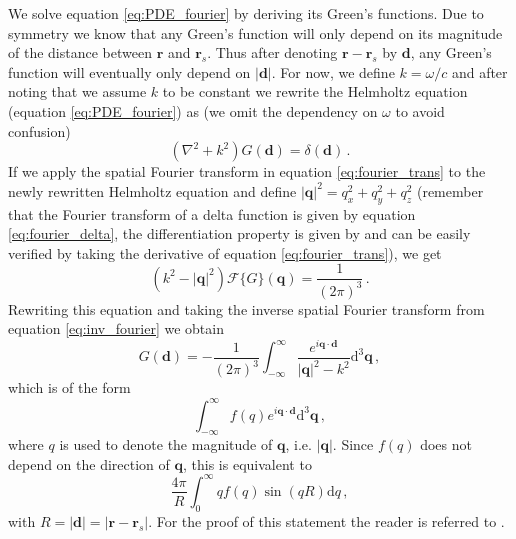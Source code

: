 We solve equation \ref{eq:PDE_fourier} by deriving its Green's functions.
Due to symmetry we know that any Green's function will only depend on its magnitude of the distance between $\mathbf r$ and $\mathbf r_s$.
Thus after denoting $\mathbf r - \mathbf r_s$ by $\mathbf d$, any Green's function will eventually only depend on $|\mathbf d|$.
For now, we define $k = \omega/c$ and after noting that we assume $k$ to be constant we rewrite the Helmholtz equation (equation \ref{eq:PDE_fourier}) as (we omit the dependency on $\omega$ to avoid confusion)
\begin{equation}
    (\nabla^2 + k^2) G(\mathbf d) = \delta(\mathbf d)\,.\nonumber
\end{equation}
If we apply the spatial Fourier transform in equation \ref{eq:fourier_trans} to the newly rewritten Helmholtz equation and define $|\mathbf q|^2 = q_x^2 + q_y^2 + q_z^2$ (remember that the Fourier transform of a delta function is given by equation \ref{eq:fourier_delta}, the differentiation property is given by \citeauthor{Fourier_transform} \cite[Section 3.4.3]{Fourier_transform} and can be easily verified by taking the derivative of equation \ref{eq:fourier_trans}), we get
\begin{equation}
    (k^2 - |\mathbf q|^2) \mathcal F\{ G\} (\mathbf q) = \frac{1}{(2\pi)^3} \,. \nonumber
\end{equation}
Rewriting this equation and taking the inverse spatial Fourier transform from equation \ref{eq:inv_fourier} we obtain
\begin{equation}
    G(\mathbf d) = -\frac{1}{(2\pi)^3} \int_{-\infty}^\infty \frac{e^{i \mathbf q \cdot \mathbf d}}{|\mathbf q|^2-k^2} \mathrm d^3 \mathbf q \,,\label{eq:greens_on_d}
\end{equation}
which is of the form
\begin{equation}
    \int_{-\infty}^\infty f(q) e^{i \mathbf q \cdot \mathbf d} \mathrm d^3 \mathbf q \,, \nonumber
\end{equation}
where $q$ is used to denote the magnitude of $\mathbf q$, i.e. $|\mathbf q|$. Since $f(q)$ does not depend on the direction of $\mathbf q$, this is equivalent to
\begin{equation}
    \frac{4\pi}{R} \int_0^\infty q f(q) \sin(q R) \mathrm d q \,,\nonumber
\end{equation}
with $R = |\mathbf d| = |\mathbf r - \mathbf r_s|$. For the proof of this statement the reader is referred to \citeauthor{Barton} \cite[Appendix F]{Barton}.
